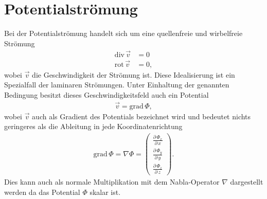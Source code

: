 %
%
%
%
\section{Potentialströmung\label{ueberschall:section:potentialstroemung}}
Bei der Potentialströmung handelt sich um eine quellenfreie 
und wirbelfreie Strömung
\begin{align*}
    \mathrm{div}\,\vec{v} &= 0 \\
    \mathrm{rot}\,\vec{v} &= 0,
\end{align*}
wobei $\vec{v}$ die Geschwindigkeit der Strömung ist.
Diese Idealisierung ist ein Spezialfall der laminaren Strömungen.
Unter Einhaltung der genannten Bedingung besitzt dieses
Geschwindigkeitsfeld auch ein Potential
\begin{align}
    \vec{v} = \mathrm{grad}\,\Phi,\label{eq:potential}
\end{align}
wobei $\vec{v}$ auch als Gradient des Potentials bezeichnet wird
und bedeutet nichts geringeres als 
die Ableitung in jede Koordinatenrichtung
\begin{align}
    \mathrm{grad}\,\Phi
    =
    \nabla\Phi
    =
    \begin{pmatrix}
        \frac{\partial\,\Phi_x}{\partial\,x}\\
        \frac{\partial\,\Phi_y}{\partial\,y}\\
        \frac{\partial\,\Phi_z}{\partial\,z}
    \end{pmatrix}.
\end{align} 
Dies kann auch als normale Multiplikation mit dem Nabla-Operator $\nabla$
dargestellt werden da das Potential $\Phi$ skalar ist.

